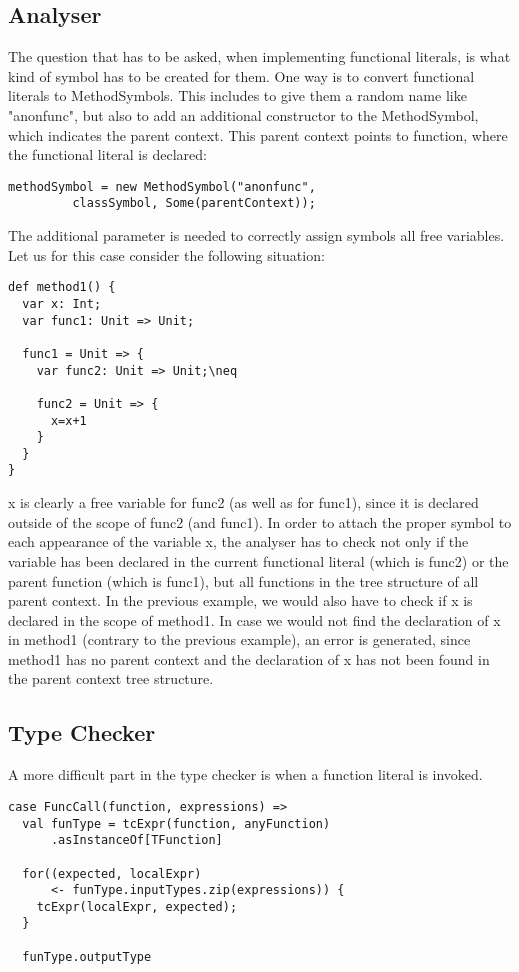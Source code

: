 \subsection{Analyser}
The question that has to be asked, when implementing functional literals, is what kind of symbol has to be created for them. One way is to convert functional literals to MethodSymbols. This includes to give them a random name like "anonfunc", but also to add an additional constructor to the MethodSymbol, which indicates the parent context. This parent context points to function, where the functional literal is declared:
\begin{lstlisting}
methodSymbol = new MethodSymbol("anonfunc",
         classSymbol, Some(parentContext));
\end{lstlisting}
The additional parameter is needed to correctly assign symbols all free variables. Let us for this case consider the following situation:
\begin{lstlisting}
def method1() {
  var x: Int;
  var func1: Unit => Unit;

  func1 = Unit => {
    var func2: Unit => Unit;\neq

    func2 = Unit => {
      x=x+1
    }
  }
}
\end{lstlisting}
x is clearly a free variable for func2 (as well as for func1), since it is declared outside of the scope of func2 (and func1). In order to attach the proper symbol to each appearance of the variable x, the analyser has to check not only if the variable has been declared in the current functional literal (which is func2) or the parent function (which is func1), but all functions in the tree structure of all parent context. In the previous example, we would also have to check if x is declared in the scope of method1. In case we would not find the declaration of x in method1 (contrary to the previous example), an error is generated, since method1 has no parent context and the declaration of x has not been found in the parent context tree structure.

\subsection{Type Checker}

A more difficult part in the type checker is when a function literal is invoked.

\begin{lstlisting}
case FuncCall(function, expressions) =>
  val funType = tcExpr(function, anyFunction)
      .asInstanceOf[TFunction]
          
  for((expected, localExpr)
      <- funType.inputTypes.zip(expressions)) {
    tcExpr(localExpr, expected);
  }
          
  funType.outputType
\end{lstlisting}

